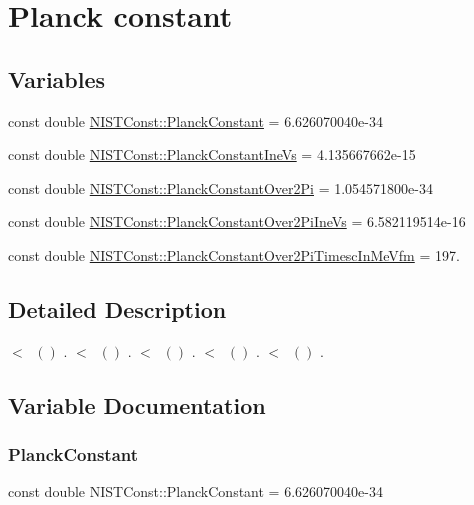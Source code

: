 \hypertarget{group___planck_constant}{}\section{Planck constant}
\label{group___planck_constant}
\subsection*{Variables}
\begin{DoxyCompactItemize}
\item 
const double \hyperlink{group___planck_constant_ga6caa482b17de2f08f423eff1a521b0d7}{N\+I\+S\+T\+Const\+::\+Planck\+Constant} = 6.\+626070040e-\/34
\item 
const double \hyperlink{group___planck_constant_ga4587d736f45c35788453a9509eaee7f2}{N\+I\+S\+T\+Const\+::\+Planck\+Constant\+Ine\+Vs} = 4.\+135667662e-\/15
\item 
const double \hyperlink{group___planck_constant_ga9b3484c3c80e4a97206c7945b0db539b}{N\+I\+S\+T\+Const\+::\+Planck\+Constant\+Over2\+Pi} = 1.\+054571800e-\/34
\item 
const double \hyperlink{group___planck_constant_ga1d45cff7c25d4ebb0639311d5c3ea20d}{N\+I\+S\+T\+Const\+::\+Planck\+Constant\+Over2\+Pi\+Ine\+Vs} = 6.\+582119514e-\/16
\item 
const double \hyperlink{group___planck_constant_ga76ea84456bc32be18fa15034da108214}{N\+I\+S\+T\+Const\+::\+Planck\+Constant\+Over2\+Pi\+Timesc\+In\+Me\+Vfm} = 197.
\end{DoxyCompactItemize}


\subsection{Detailed Description}
$<$ $ \ ()$ . $<$ $ \ ()$ . $<$ $ \ ()$ . $<$ $ \ ()$ . $<$ $ \ ()$ . 

\subsection{Variable Documentation}
\mbox{\label{group___planck_constant_ga6caa482b17de2f08f423eff1a521b0d7}} 
\subsubsection{\texorpdfstring{Planck\+Constant}{PlanckConstant}}
{\footnotesize\ttfamily const double N\+I\+S\+T\+Const\+::\+Planck\+Constant = 6.\+626070040e-\/34}

